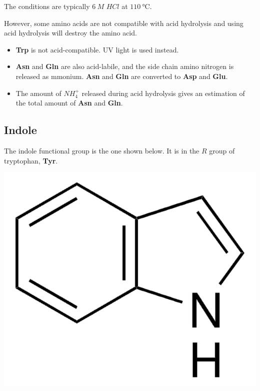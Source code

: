 \documentclass[11pt]{article}
\begin{document}
The conditions are typically \(\qty{6}{\unit{M}}\) \(HCl\) at \(\qty{110}{\unit{\degreeCelsius}}\).


However, some amino acids are not compatible with acid hydrolysis and using acid hydrolysis will destroy the amino acid.
\begin{itemize}
\item \textbf{Trp} is not acid-compatible. UV light is used instead.
\item \textbf{Asn} and \textbf{Gln} are also acid-labile, and the side chain amino nitrogen is released as mmonium. \textbf{Asn} and \textbf{Gln} are converted to \textbf{Asp} and \textbf{Glu}.
\item The amount of \(NH_4^+\) released during acid hydrolysis gives an estimation of the total amount of \textbf{Asn} and \textbf{Gln}.
\end{itemize}
\subsection{Indole}
\label{sec:org11481a8}
The indole functional group is the one shown below. It is in the \(R\) group of tryptophan, \textbf{Tyr}.

\begin{center}
\includegraphics[scale=0.3]{./images/indole.png}
\end{center}

\newpage
\end{document}
